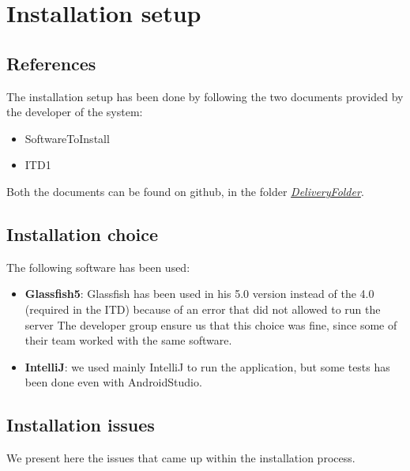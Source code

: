 \documentclass[../ATD.tex]{subfiles}
\begin{document}
    \chapter{Installation setup}\label{ch:installation-setup}
    \section{References}\label{sec:references}
    The installation setup has been done by following the two documents provided by the developer of the system:
    \begin{itemize}
        \item SoftwareToInstall
        \item ITD1
    \end{itemize}
    Both the documents can be found on github, in the folder \href{https://github.com/gianfi12/AbboAccordiBonetti/DeliveryFolder}{\emph{DeliveryFolder}}.

    \section{Installation choice}\label{sec:installation-choice}
    The following software has been used:
    \begin{itemize}
        \item \textbf{Glassfish5}: Glassfish has been used in his 5.0 version instead of the 4.0 (required in the ITD) because of an error that did not allowed to run the server
        The developer group ensure us that this choice was fine, since some of their team worked with the same software.
        \item \textbf{IntelliJ}: we used mainly IntelliJ to run the application, but some tests has been done even with AndroidStudio.
    \end{itemize}

    \section{Installation issues}\label{sec:installation-issues}
    We present here the issues that came up within the installation process.
\end{document}
